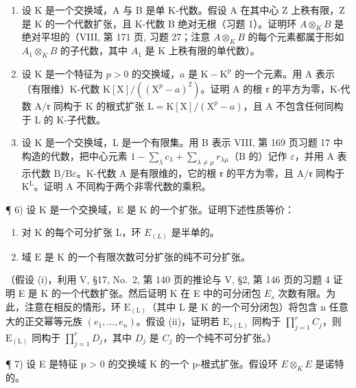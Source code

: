 \begin{enumerate}
\def\labelenumi{\arabic{enumi})}
\setcounter{enumi}{2}
\item
  设 K 是一个交换域，A 与 B 是单 K-代数。假设 A 在其中心 Z 上秩有限，Z 是 K 的一个代数扩张，且 K-代数 B 绝对无根（习题 1）。证明环 \(A \otimes_{K} B\) 是绝对平坦的（VIII, 第 171 页, 习题 27；注意 \(A \otimes_{K} B\) 的每个元素都属于形如 \(A_{1} \otimes_{K} B\) 的子代数，其中 \(A_{1}\) 是 K 上秩有限的单代数）。
\item
  设 \(\mathrm{K}\) 是一个特征为 \(p > 0\) 的交换域，\(a\) 是 \(\mathrm{K} - \mathrm{K}^p\) 的一个元素。用 A 表示（有限维）K-代数 \(\mathrm{K}[\mathrm{X}] / ((\mathrm{X}^p - a)^2)\)。证明 A 的根 \(\mathfrak{r}\) 的平方为零，K-代数 \(\mathrm{A} / \mathfrak{r}\) 同构于 K 的根式扩张 \(\mathrm{L} = \mathrm{K}[\mathrm{X}] / (\mathrm{X}^{p} - a)\)，且 A 不包含任何同构于 L 的 K-子代数。
\item
  设 \(\mathrm{K}\) 是一个交换域，\(\mathrm{L}\) 是一个有限集。用 B 表示 VIII, 第 169 页习题 17 中构造的代数，把中心元素 \(1 - \sum_{\lambda} c_{\lambda} + \sum_{\lambda \neq \mu} r_{\lambda \mu}\)（\(\mathrm{B}\) 的）记作 \(\varepsilon\)，并用 A 表示代数 \(\mathrm{B} / \mathrm{B}\varepsilon\)。K-代数 A 是有限维的，它的根 \(\mathfrak{r}\) 的平方为零，且 \(\mathrm{A} / \mathfrak{r}\) 同构于 \(\mathrm{K}^{\mathrm{L}}\)。证明 A 不同构于两个非零代数的乘积。
\end{enumerate}

¶ 6) 设 K 是一个交换域，E 是 K 的一个扩张。证明下述性质等价：

\begin{enumerate}
\def\labelenumi{(\roman{enumi})}
\item
  对 K 的每个可分扩张 L，环 \(E_{(L)}\) 是半单的。
\item
  域 \(\mathrm{E}\) 是 \(\mathrm{K}\) 的一个有限次数可分扩张的纯不可分扩张。
\end{enumerate}

（假设 (i)，利用 V, §17, No.~2, 第 140 页的推论与 V, §2, 第 146 页的习题 4 证明 E 是 K 的一个代数扩张。然后证明 K 在 E 中的可分闭包 \(E_{s}\) 次数有限。为此，注意在相反的情形，环 \(\mathrm{E}_{(\mathrm{L})}\)（其中 L 是 K 的一个可分闭包）将包含 n 任意大的正交幂等元族 \((e_{1},\ldots,e_{n})\)。假设 (ii)，证明若 \(\mathrm{E}_{s(\mathrm{L})}\) 同构于 \(\prod_{j=1}^{r}C_{j}\)，则 \(\mathrm{E}_{(\mathrm{L})}\) 同构于 \(\prod_{j=1}^{r}D_{j}\)，其中 \(D_{j}\) 是 \(C_{j}\) 的一个纯不可分扩张。）

¶ 7) 设 E 是特征 p \textgreater{} 0 的交换域 K 的一个 p-根式扩张。假设环 \(E \otimes_{K} E\) 是诺特的。

